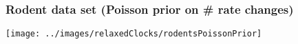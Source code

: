 \begin{frame}
\frametitle{Rodent data set (Poisson prior on \# rate changes)}

\begin{centering}

\texttt{[image: ../images/relaxedClocks/rodentsPoissonPrior]}

\end{centering}

\end{frame}